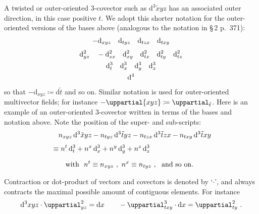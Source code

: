 \documentclass[\ifafour a4paper,12pt,\else a5paper,10pt,\fi%
onecolumn,oneside,article,%
british%
]{memoir}
\theoremstyle{remark}
\theoremstyle{innote}
\newcommand*{\de}{\uppartial}%
\newcommand*{\di}{\mathrm{d}}%
\newcommand*{\defd}{\coloneqq}
\renewcommand*{\|}[1][]{\nonscript\:#1\vert\nonscript\:\mathopen{}}
\newcommand*{\sect}{\S}%
\newcommand*{\se}[1]{\de_{#1}}
\newcommand*{\sse}[1]{\de^{2}_{#1}}
\newcommand*{\ssse}[1]{\de^{3}_{#1}}
\newcommand*{\si}[1]{\di{#1}}
\newcommand*{\sssi}[1]{\di^{3}{#1}}
\newcommand*{\tw}[1]{\tilde{#1}}
\newcommand*{\te}[1]{\de{#1}}
\newcommand*{\ti}[1]{\di_{#1}}
\newcommand*{\tti}[1]{\di^{2}_{#1}}
\newcommand*{\ttti}[1]{\di^{3}_{#1}}
\newcommand*{\tttti}[1]{\di^{4}_{#1}}
\begin{document}
A twisted or outer-oriented 3-covector such as $\sssi{\tw{x}yz}$ has an associated outer direction, in this case positive $t$. We adopt this shorter notation for the outer-oriented versions of the bases above (analogous to the notation in  \cites{gotayetal1992} \sect\,2 p.~371):
\begin{subequations}\label{eq:basis_twshort}
  \begin{gather}
    \label{eq:basis_1vec_twshort}
    -\ti{xyz}\quad
    \ti{tyz}\quad
    \ti{tzx}\quad
    \ti{txy}
    \\[\jot]
    \label{eq:basis_2vec_twshort}
    \tti{yz}\quad
    -\tti{zx}\quad
    \tti{xy}\quad
    \tti{tx}\quad
    \tti{ty}\quad
    \tti{tz}
    \\
    \label{eq:basis_3vec_twshort}
    \ttti{t}\quad
    \ttti{x}\quad
    \ttti{y}\quad
    \ttti{z}
    \\
    \label{eq:basis_4vec_twshort}
    \tttti{}
  \end{gather}
\end{subequations}
so that $-\ti{xyz} \defd \si{\tw{t}}$ and so on. Similar notation is used for outer-oriented multivector fields; for instance $-\te{xyz} \defd \se{\tw{t}}$. Here is an example of an outer-oriented 3-covector written in terms of the bases and notation above. Note the position of the super- and sub-scripts:
\begin{equation}
  \label{eq:examples_expansion}
  \begin{split}
   &\quad n_{xyz}\,\sssi{\tw{x}yz}
    -n_{tyz}\,\sssi{\tw{t}yz}
    -n_{tzx}\,\sssi{\tw{t}zx}
    -n_{txy}\,\sssi{\tw{t}xy}
    \\[\jot]
    &\equiv
    n^{t}\,\ttti{t} +
    n^{x}\,\ttti{x} +
    n^{y}\,\ttti{y} +
    n^{z}\,\ttti{z}
    \\[2\jot]
    &\qquad\text{with }\ 
    n^{t} \equiv n_{xyz}\ ,\
    n^{x} \equiv n_{tyz}\ ,\
    \text{ and so on}.
  \end{split}
\end{equation}

\medskip

Contraction or dot-product of vectors and covectors is denoted by \enquote*{$\cdot$}, and always contracts the maximal possible amount of contiguous elements. For instance
\begin{equation}
  \label{eq:contraction_ex}
  \sssi{xyz} \cdot \sse{yz} = \si{x}
  \qquad
  -\ssse{txy} \cdot \si{x} = \sse{ty} \ .
\end{equation}
\end{document}
